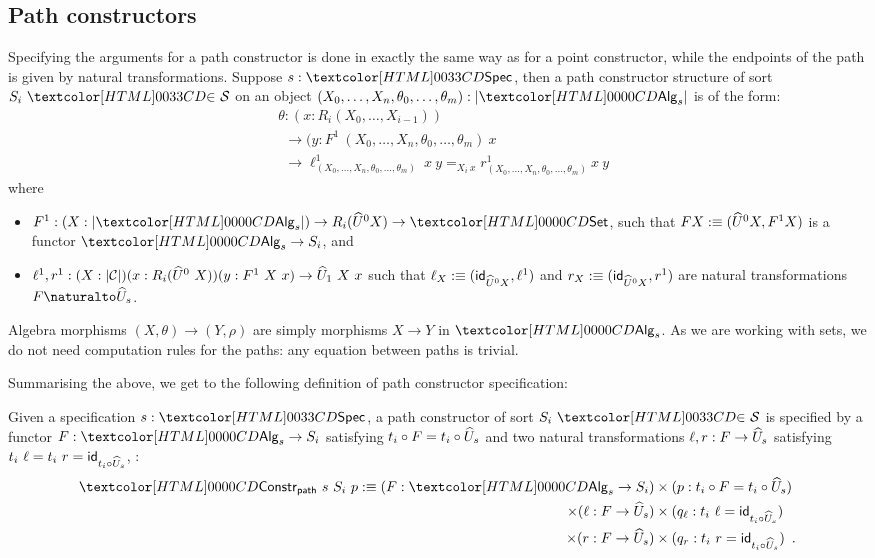 \subsection{Path constructors}
\label{path-constructors}

Specifying the arguments for a path constructor is done in exactly the
same way as for a point constructor, while the endpoints of the path
is given by natural transformations. Suppose $s : \specty$, then a path
constructor structure of sort $\sortsin{S_i}{\Ss}$ on an object
$(X_0, \hdots, X_n, \theta_0,\hdots,\theta_m) : | \Alg_s |$ is of the
form:
\begin{align*}
  &\theta : (x : R_i (X_0, \hdots, X_{i-1})) \\
  &\ \ \to (y : F^1\ (X_0, \hdots, X_n, \theta_0, \hdots, \theta_m)\ x \\
  &\ \ \to \ell^1_{(X_0,\hdots,X_n,\theta_0,\hdots,\theta_m)}\ x\ y =_{X_i\ x} r^1_{(X_0,\hdots,X_n,\theta_0,\hdots,\theta_m)}\ x\ y 
\end{align*}
where
\begin{itemize}
\item $F^1 : (X : | \Alg_s |) \to R_i (\extendfunc{U}^0 X) \to \Set$, such
  that $F X :\equiv (\widehat{U}^0 X, F^1 X)$ is a functor $\Alg_s \to S_i$, and
\item
  $\ell^1, r^1 : (X : | \mathcal{C} |) (x : R_i (\widehat{U}^0\ X)) (y : F^1\ X\ x)
  \to \widehat{U}_1\ X\ x$
  such that $\ell_X \ddefeq (\id_{\extendfunc{U}^0 X}, \ell^1)$ and
  $r_X \ddefeq (\id_{\extendfunc{U}^0 X}, r^1)$ are natural transformations
  $\Nat{F}{\extendfunc{U}_s}$.
\end{itemize}
Algebra morphisms $(X,\theta) \to (Y,\rho)$ are simply morphisms
$X \to Y$ in $\Alg_s$. As we are working with sets, we do not need
computation rules for the paths: any equation between paths is
trivial.

Summarising the above, we get to the following definition of
path constructor specification:

\begin{definition}
  Given a specification $s : \specty$, a path constructor of sort
  $\sortsin{S_i}{\Ss}$ is specified by a functor $F : \Alg_s \to S_i$
  satisfying $t_i \circ F = t_i \circ \widehat{U}_s$ and two natural
  transformations $\ell, r : F \to \widehat{U}_s$ satisfying
  $t_i\ \ell = t_i\ r = \id_{t_i \circ \extendfunc{U}_s}$, \ie:
\begin{align*}
  \Constr_{\ident{path}}\ s\ S_i\ p \ddefeq (F : \Alg_s \to S_i) &\times (p : t_i \circ F = t_i \circ \extendfunc{U}_s) \\ 
  \times (\ell : F \to \extendfunc{U}_s) &\times (q_\ell : t_i\ \ell = \id_{t_i \circ \extendfunc{U}_s}) \\ 
  \times (r : F \to \extendfunc{U}_s) &\times (q_r : t_i\ r = \id_{t_i \circ \extendfunc{U}_s}) \enspace .
\end{align*}
\end{definition}


